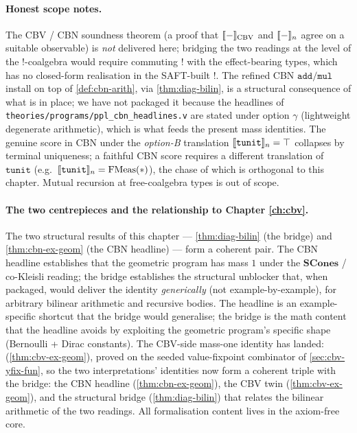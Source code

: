 \paragraph{Honest scope notes.}
The CBV / CBN soundness theorem (a proof that
$[\![ - ]\!]_{\mathrm{CBV}}$ and $[\![ - ]\!]_n$ agree on a suitable observable)
is \emph{not} delivered here; bridging the two readings at the level
of the $\mathord{!}$-coalgebra would require commuting $\mathord{!}$
with the effect-bearing types, which has no closed-form realisation in
the SAFT-built $\mathord{!}$. The refined CBN $\mathtt{add}/\mathtt{mul}$
install on top of \autoref{def:cbn-arith}, via
\autoref{thm:diag-bilin}, is a structural consequence of what is
in place; we have not packaged it because the headlines of
\texttt{theories/programs/ppl\_cbn\_headlines.v} are stated under
option $\gamma$ (lightweight degenerate arithmetic), which is what
feeds the present mass identities. The genuine score in CBN under the
\emph{option-B} translation $[\![ \mathtt{tunit} ]\!]_n = \top$ collapses
by terminal uniqueness; a faithful CBN score requires a different
translation of $\mathtt{tunit}$ (e.g.\ $[\![ \mathtt{tunit} ]\!]_n =
\mathrm{FMeas}(\ast)$), the chase of which is orthogonal to this chapter.
Mutual recursion at free-coalgebra types is out of scope.

\paragraph{The two centrepieces and the relationship to Chapter
\ref{ch:cbv}.}
The two structural results of this chapter ---
\autoref{thm:diag-bilin} (the bridge) and
\autoref{thm:cbn-ex-geom} (the CBN headline) --- form a coherent pair.
The CBN headline establishes that the geometric program has mass $1$
under the $\mathbf{SCones}$ / co-Kleisli reading; the bridge establishes
the structural unblocker that, when packaged, would deliver the
identity \emph{generically} (not example-by-example), for arbitrary
bilinear arithmetic and recursive bodies. The headline is an
example-specific shortcut that the bridge would generalise; the
bridge is the math content that the headline avoids by exploiting the
geometric program's specific shape (Bernoulli + Dirac constants). The
CBV-side mass-one identity has landed:
(\autoref{thm:cbv-ex-geom}), proved on the seeded value-fixpoint
combinator of \autoref{sec:cbv-yfix-fun}, so the two
interpretations' identities now form a coherent triple with the
bridge: the CBN headline (\autoref{thm:cbn-ex-geom}), the CBV twin
(\autoref{thm:cbv-ex-geom}), and the structural bridge
(\autoref{thm:diag-bilin}) that relates the bilinear arithmetic of
the two readings. All formalisation
content lives in the axiom-free core.
